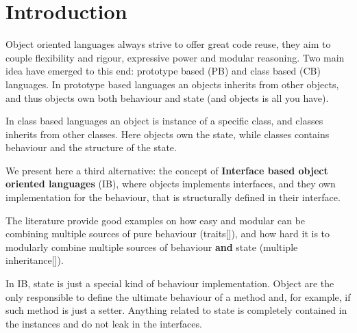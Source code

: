 \section{Introduction}\label{sec:intro}



Object oriented languages always strive to offer great code reuse,
they aim to couple flexibility and rigour, expressive power and modular reasoning.
Two main idea have emerged to this end: prototype based (PB) and class based (CB) languages.
In prototype based languages an objects inherits from other objects,
and thus objects own both behaviour and state (and objects is all you have).

In class based languages an object is instance of a specific class, and classes inherits from other classes.
Here objects own the state, while classes contains behaviour and the structure of the state.

We present here a third alternative: the concept of
 \textbf{Interface based object oriented languages} (IB), where 
  objects implements interfaces, and they own implementation for the behaviour,
that is structurally defined in their interface.
  
  The literature provide good examples on how easy and modular can be combining
  multiple sources of pure behaviour (traits[]), and how
  hard it is to modularly combine multiple sources of behaviour \textbf{and} state (multiple inheritance[]).

  In IB, state is just a special kind of behaviour implementation.
  Object are the only responsible to define 
  the ultimate behaviour of a method and, for example, if such method is just a setter.
  Anything related to state is completely contained in the instances and do not leak in the interfaces.

